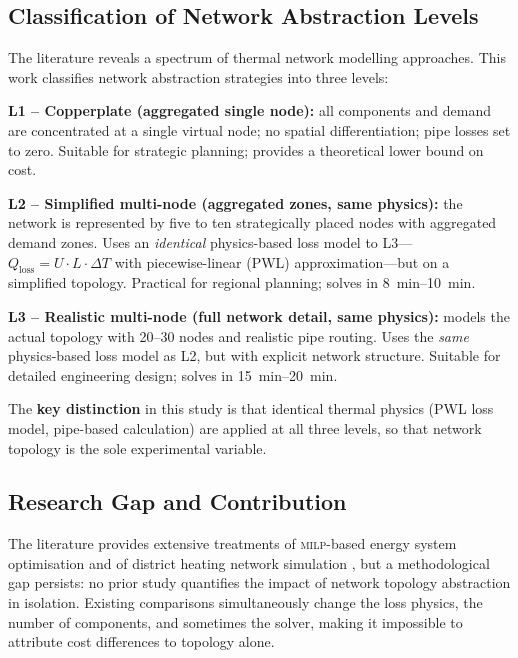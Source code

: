 \documentclass[a4paper,fleqn]{cas-sc}
\newcommand{\milp}{\textsc{milp}}
\begin{document}
\subsection{Classification of Network Abstraction Levels}

The literature reveals a spectrum of thermal network modelling approaches.
This work classifies network abstraction strategies into three levels:

\textbf{L1 -- Copperplate (aggregated single node):} all components and
demand are concentrated at a single virtual node; no spatial
differentiation; pipe losses set to zero.  Suitable for strategic
planning; provides a theoretical lower bound on cost.

\textbf{L2 -- Simplified multi-node (aggregated zones, same physics):}
the network is represented by five to ten strategically placed nodes with
aggregated demand zones.  Uses an \emph{identical} physics-based loss
model to L3---$Q_{\mathrm{loss}} = U \cdot L \cdot \Delta T$ with
piecewise-linear (PWL) approximation---but on a simplified topology.
Practical for regional planning; solves in \SIrange{8}{10}{min}.

\textbf{L3 -- Realistic multi-node (full network detail, same physics):}
models the actual topology with 20--30 nodes and realistic pipe routing.
Uses the \emph{same} physics-based loss model as L2, but with explicit
network structure.  Suitable for detailed engineering design; solves in
\SIrange{15}{20}{min}.

The \textbf{key distinction} in this study is that identical thermal
physics (PWL loss model, pipe-based calculation) are applied at all three
levels, so that network topology is the sole experimental variable.

\subsection{Research Gap and Contribution}

The literature provides extensive treatments of \milp{}-based energy system
optimisation \cite{Lund2009,Bloess2018,Robinius2017} and of district heating
network simulation \cite{Benonysson1995,Frederiksen2013,Moller2017}, but a
methodological gap persists: no prior study quantifies the impact of network
topology abstraction in isolation.  Existing comparisons simultaneously
change the loss physics, the number of components, and sometimes the solver,
making it impossible to attribute cost differences to topology alone.
\end{document}
